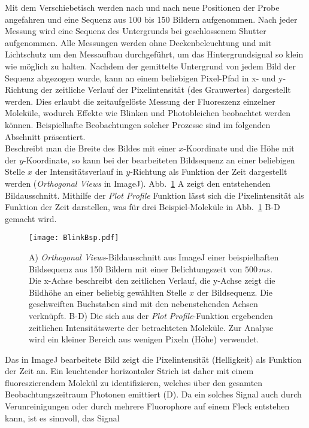 Mit dem Verschiebetisch werden nach und nach neue Positionen der Probe angefahren und eine Sequenz 
aus 100 bis 150 Bildern aufgenommen. Nach jeder Messung wird eine Sequenz des Untergrunds bei geschlossenem 
Shutter aufgenommen. Alle Messungen werden ohne Deckenbeleuchtung und mit Lichtschutz um den Messaufbau 
durchgeführt, um das Hintergrundsignal so klein wie möglich zu halten. Nachdem der gemittelte Untergrund 
von jedem Bild der Sequenz abgezogen wurde, kann an einem beliebigen Pixel-Pfad in x- und y-Richtung der 
zeitliche Verlauf der Pixelintensität (des Grauwertes) dargestellt werden. 
Dies erlaubt die zeitaufgelöste Messung der Fluoreszenz einzelner Moleküle, 
wodurch Effekte wie Blinken und Photobleichen beobachtet werden können. 
Beispielhafte Beobachtungen solcher Prozesse sind im folgenden Abschnitt präsentiert. \\
Beschreibt man die Breite des Bildes mit einer $x$-Koordinate und die Höhe mit der $y$-Koordinate, so kann 
bei der bearbeiteten Bildsequenz an einer beliebigen Stelle $x$ der Intensitätsverlauf in $y$-Richtung
als Funktion der Zeit dargestellt werden (\textit{Orthogonal Views} in ImageJ). 
Abb.~\ref{fig:beispielBlink} A zeigt den entstehenden Bildausschnitt. Mithilfe der \textit{Plot Profile}
Funktion lässt sich die Pixelintensität als Funktion der Zeit darstellen, was für drei Beispiel-Moleküle 
in Abb.~\ref{fig:beispielBlink} B-D gemacht wird. 
\begin{figure}[h!]
    \centering
    \texttt{[image: BlinkBsp.pdf]}
    \caption{\label{fig:beispielBlink}A) \textit{Orthogonal Views}-Bildausschnitt aus ImageJ einer 
    beispielhaften Bildsequenz aus 150 Bildern mit einer Belichtungszeit von $500\,\si{ms}$. Die x-Achse beschreibt den 
    zeitlichen Verlauf, die y-Achse zeigt die Bildhöhe an einer beliebig gewählten Stelle $x$ der Bildsequenz. Die geschweiften 
    Buchstaben sind mit den nebenstehenden Achsen verknüpft. B-D) Die sich aus der \textit{Plot Profile}-Funktion ergebenden 
    zeitlichen Intensitätswerte der betrachteten Moleküle. Zur Analyse wird ein kleiner Bereich aus wenigen Pixeln (Höhe) verwendet.}
\end{figure}\FloatBarrier
Das in ImageJ bearbeitete Bild zeigt die Pixelintensität (Helligkeit) als Funktion 
der Zeit an. Ein leuchtender horizontaler Strich ist daher mit 
einem fluoreszierendem Molekül zu identifizieren, welches über den 
gesamten Beobachtungszeitraum Photonen emittiert (D). 
Da ein solches Signal auch durch Verunreinigungen oder durch mehrere 
Fluorophore auf einem Fleck entstehen kann, ist es sinnvoll, das Signal 
